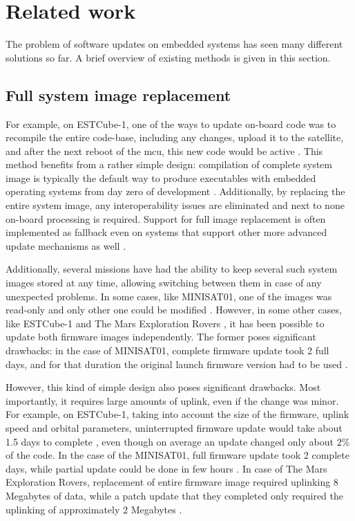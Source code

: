 \newpage
\section{Related work}

The problem of software updates on embedded systems has seen many different solutions so far. A brief overview of existing methods is given in this section.

\subsection{Full system image replacement}

For example, on ESTCube-1, one of the ways to update on-board code was to recompile the entire code-base, including any changes, upload it to the satellite, and after the next reboot of the \gls{mcu}, this new code would be active \cite{Suenter2016}. This method benefits from a rather simple design: compilation of complete system image is typically the default way to produce executables with embedded operating systems from day zero of development . Additionally, by replacing the entire system image, any interoperability issues are eliminated and next to none on-board processing is required. Support for full image replacement is often implemented as fallback even on systems that support other more advanced update mechanisms as well \cite{Tarbe2013,Greco2005,Garrido1998}.

Additionally, several missions have had the ability to keep several such system images stored at any time, allowing switching between them in case of any unexpected problems. In some cases, like MINISAT01, one of the images was read-only and only other one could be modified \cite{Garrido1998}. However, in some other cases, like  ESTCube-1 \cite{Tarbe2013} and The Mars Exploration Rovers \cite{Greco2005}, it has been possible to update both firmware images independently. The former poses significant drawbacks: in the case of MINISAT01, complete firmware update took 2 full days, and for that duration the original launch firmware version had to be used \cite{Garrido1998}. 


However, this kind of simple design also poses significant drawbacks. Most importantly, it requires large amounts of uplink, even if the change was minor. For example, on ESTCube-1, taking into account the size of the firmware, uplink speed and orbital parameters, uninterrupted firmware update would take about 1.5 days to complete \cite{Suenter2014}, even though on average an update changed only about $2\%$ of the code. In the case of the MINISAT01, full firmware update took 2 complete days, while partial update could be done in few hours \cite{Garrido1998}. In case of The Mars Exploration Rovers, replacement of entire firmware image required uplinking 8 Megabytes of data, while a patch update that they completed only required the uplinking of approximately 2 Megabytes \cite{Greco2005}.

